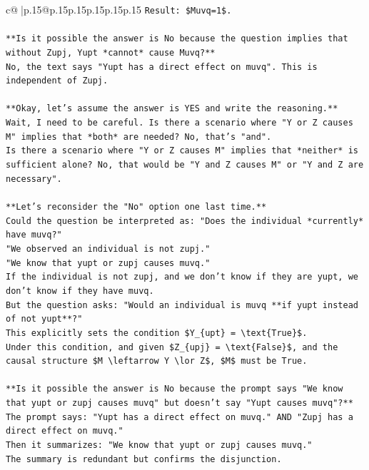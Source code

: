 \documentclass{article}
\begin{document}
{\begin{supertabular}{c@{$\;$}|p{.15\linewidth}@{}p{.15\linewidth}p{.15\linewidth}p{.15\linewidth}p{.15\linewidth}p{.15\linewidth}}
{{{\texttt{Result: \$Muvq=1\$.} \\
\\ 
\texttt{**Is it possible the answer is No because the question implies that without Zupj, Yupt *cannot* cause Muvq?**} \\
\texttt{No, the text says "Yupt has a direct effect on muvq". This is independent of Zupj.} \\
\\ 
\texttt{**Okay, let's assume the answer is YES and write the reasoning.**} \\
\texttt{Wait, I need to be careful. Is there a scenario where "Y or Z causes M" implies that *both* are needed? No, that's "and".} \\
\texttt{Is there a scenario where "Y or Z causes M" implies that *neither* is sufficient alone? No, that would be "Y and Z causes M" or "Y and Z are necessary".} \\
\\ 
\texttt{**Let's reconsider the "No" option one last time.**} \\
\texttt{Could the question be interpreted as: "Does the individual *currently* have muvq?"} \\
\texttt{"We observed an individual is not zupj."} \\
\texttt{"We know that yupt or zupj causes muvq."} \\
\texttt{If the individual is not zupj, and we don't know if they are yupt, we don't know if they have muvq.} \\
\texttt{But the question asks: "Would an individual is muvq **if yupt instead of not yupt**?"} \\
\texttt{This explicitly sets the condition \$Y\_\{upt\} = \textbackslash{}text\{True\}\$.} \\
\texttt{Under this condition, and given \$Z\_\{upj\} = \textbackslash{}text\{False\}\$, and the causal structure \$M \textbackslash{}leftarrow Y \textbackslash{}lor Z\$, \$M\$ must be True.} \\
\\ 
\texttt{**Is it possible the answer is No because the prompt says "We know that yupt or zupj causes muvq" but doesn't say "Yupt causes muvq"?**} \\
\texttt{The prompt says: "Yupt has a direct effect on muvq." AND "Zupj has a direct effect on muvq."} \\
\texttt{Then it summarizes: "We know that yupt or zupj causes muvq."} \\
\texttt{The summary is redundant but confirms the disjunction.} \\
}}}
\end{supertabular}}
\end{document}
